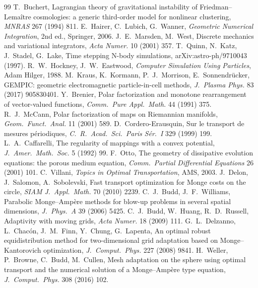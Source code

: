 \documentclass[11pt,a4paper]{article}
\numberwithin{equation}{section}
\theoremstyle{definition}
\theoremstyle{remark}
\begin{document}
\begin{thebibliography}{99}
 T.~Buchert, Lagrangian theory of gravitational instability of Friedman--Lema\^itre cosmologies: a generic third-order model for nonlinear clustering, \emph{MNRAS} 267 (1994) 811.
 E.~Hairer, C.~Lubich, G.~Wanner, \emph{Geometric Numerical Integration}, 2nd ed., Springer, 2006.
 J.~E.~Marsden, M.~West, Discrete mechanics and variational integrators, \emph{Acta Numer.} 10 (2001) 357.
 T.~Quinn, N.~Katz, J.~Stadel, G.~Lake, Time stepping N-body simulations, arXiv:astro-ph/9710043 (1997).
 R.~W.~Hockney, J.~W.~Eastwood, \emph{Computer Simulation Using Particles}, Adam Hilger, 1988.
 M.~Kraus, K.~Kormann, P.~J.~Morrison, E.~Sonnendr\"ucker, GEMPIC: geometric electromagnetic particle-in-cell methods, \emph{J.\ Plasma Phys.} 83 (2017) 905830401.
 Y.~Brenier, Polar factorization and monotone rearrangement of vector-valued functions, \emph{Comm.\ Pure Appl.\ Math.} 44 (1991) 375.
 R.~J.~McCann, Polar factorization of maps on Riemannian manifolds, \emph{Geom.\ Funct.\ Anal.} 11 (2001) 589.
 D.~Cordero-Erausquin, Sur le transport de mesures p\'eriodiques, \emph{C.\ R.\ Acad.\ Sci.\ Paris S\'er.\ I} 329 (1999) 199.
 L.~A.~Caffarelli, The regularity of mappings with a convex potential, \emph{J.\ Amer.\ Math.\ Soc.} 5 (1992) 99.
 F.~Otto, The geometry of dissipative evolution equations: the porous medium equation, \emph{Comm.\ Partial Differential Equations} 26 (2001) 101.
 C.~Villani, \emph{Topics in Optimal Transportation}, AMS, 2003.
 J.~Delon, J.~Salomon, A.~Sobolevski, Fast transport optimization for Monge costs on the circle, \emph{SIAM J.\ Appl.\ Math.} 70 (2010) 2239.
 C.~J.~Budd, J.~F.~Williams, Parabolic Monge--Amp\`ere methods for blow-up problems in several spatial dimensions, \emph{J.\ Phys.\ A} 39 (2006) 5425.
 C.~J.~Budd, W.~Huang, R.~D.~Russell, Adaptivity with moving grids, \emph{Acta Numer.} 18 (2009) 111.
 G.~L.~Delzanno, L.~Chac\'on, J.~M.~Finn, Y.~Chung, G.~Lapenta, An optimal robust equidistribution method for two-dimensional grid adaptation based on Monge--Kantorovich optimization, \emph{J.\ Comput.\ Phys.} 227 (2008) 9841.
 H.~Weller, P.~Browne, C.~Budd, M.~Cullen, Mesh adaptation on the sphere using optimal transport and the numerical solution of a Monge--Amp\`ere type equation, \emph{J.\ Comput.\ Phys.} 308 (2016) 102.

\end{thebibliography}
\end{document}
